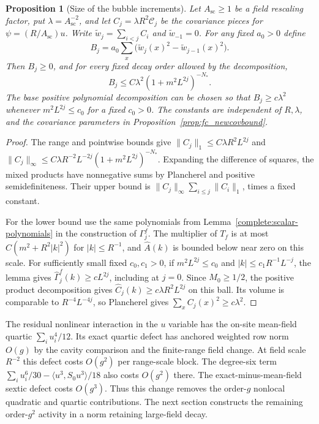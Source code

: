 \documentclass[11pt]{article}
\newtheorem{proposition}{Proposition}[section]
\begin{document}
\begin{proposition}[Size of the bubble increments]\label{prop:fc_bubble}
Let \(A_{\mathrm{sc}}\ge1\) be a field rescaling factor, put
\(\lambda=A_{\mathrm{sc}}^{-2}\), and let
\(C_j=\lambda R^2\mathscr C_j\) be the covariance pieces for
\(\psi=(R/A_{\mathrm{sc}})u\). Write \(\widetilde w_j=\sum_{i<j}C_i\) and
\(\widetilde w_{-1}=0\). For any fixed \(a_0>0\) define
\[
 B_j=a_0\sum_x \big(\widetilde w_j(x)^2-\widetilde w_{j-1}(x)^2\big).
\]
Then \(B_j\ge0\), and for every fixed decay order allowed by the
decomposition,
\[
 B_j\le C\lambda^2(1+m^2L^{2j})^{-N_*}.
\]
The base positive polynomial decomposition can be chosen so that
\(B_j\ge c\lambda^2\) whenever \(m^2L^{2j}\le c_0\) for a fixed
\(c_0>0\). The constants are independent of \(R,\lambda\), and the
covariance parameters in Proposition~\ref{prop:fc_newcovbound}.
\end{proposition}

\begin{proof}
The range and pointwise bounds give
\(\|C_j\|_1\le C\lambda R^2L^{2j}\) and
\(\|C_j\|_\infty\le C\lambda R^{-2}L^{-2j}(1+m^2L^{2j})^{-N_*}\).
Expanding the difference of squares, the mixed products have nonnegative
sums by Plancherel and positive semidefiniteness. Their upper bound is
\(\|C_j\|_\infty\sum_{i\le j}\|C_i\|_1\), times a fixed constant.

For the lower bound use the same polynomials from
Lemma~\ref{complete:scalar-polynomials} in the construction of
\(\Gamma_j^f\). The multiplier of \(T_f\) is at most
\(C(m^2+R^2|k|^2)\) for \(|k|\le R^{-1}\), and
\(\widehat A(k)\) is bounded below near zero on this scale.
For sufficiently small fixed \(c_0,c_1>0\), if
\(m^2L^{2j}\le c_0\) and \(|k|\le c_1R^{-1}L^{-j}\), the lemma
gives \(\widehat\Gamma_j^f(k)\ge cL^{2j}\), including at \(j=0\).
Since \(M_0\ge1/2\), the positive product decomposition gives
\(\widehat C_j(k)\ge c\lambda R^2L^{2j}\) on this ball.
Its volume is comparable to \(R^{-4}L^{-4j}\), so Plancherel
gives \(\sum_x C_j(x)^2\ge c\lambda^2\).
\end{proof}

The residual nonlinear interaction in the \(u\) variable has the
on-site mean-field quartic \(\sum_i u_i^4/12\). Its exact quartic
defect has anchored weighted row norm \(O(g)\) by the cavity comparison
and the finite-range field change. At field scale \(R^{-2}\) this
defect costs \(O(g^2)\) per range-scale block. The degree-six term
\(\sum_i u_i^6/30-\langle u^3,S_0u^3\rangle/18\) also costs \(O(g^2)\)
there. The exact-minus-mean-field sextic defect costs \(O(g^3)\).
Thus this change removes the order-\(g\) nonlocal quadratic and
quartic contributions. The next section constructs the remaining
order-\(g^2\) activity in a norm retaining large-field decay.
\end{document}
